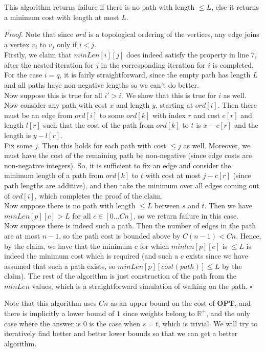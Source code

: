 \documentclass[a4paper]{article}
\newenvironment{proof}{\begin{breakbox}\textit{Proof.}}{\hfill$\square$\end{breakbox}}
\newcommand{\nl}{\vspace{0.2cm}\\}
\newcommand{\R}{\mathbb{R}}
\newcommand{\OPT}{\mathbf{OPT}}
\begin{document}
\begin{claim}
    This algorithm returns failure if there is no path with length $\le L$, else it returns a minimum cost with length at most $L$.
\end{claim}
\begin{proof}
    Note that since $ord$ is a topological ordering of the vertices, any edge joins a vertex $v_i$ to $v_j$ only if $i < j$.\nl
    Firstly, we claim that $minLen[i][j]$ does indeed satisfy the property in line $7$, after the nested iteration for $j$ in the corresponding iteration for $i$ is completed.\nl
    For the case $i = q$, it is fairly straightforward, since the empty path has length $L$ and all paths have non-negative lengths so we can't do better.\nl
    Now suppose this is true for all $i' > i$. We show that this is true for $i$ as well. Now consider any path with cost $x$ and length $y$, starting at $ord[i]$. Then there must be an edge from
    $ord[i]$ to some $ord[k]$ with index $r$ and cost $c[r]$ and length $l[r]$ such that the cost of the path from $ord[k]$ to $t$ is $x - c[r]$ and the length is $y - l[r]$.\nl
    Fix some $j$. Then this holds for each path with cost $\le j$ as well. Moreover, we must have the cost of the remaining path be non-negative (since edge costs are non-negative integers).
    So, it is sufficient to fix an edge and consider the minimum length of a path from $ord[k]$ to $t$ with cost at most $j - c[r]$ (since path lengths are additive), and then take the minimum
    over all edges coming out of $ord[i]$, which completes the proof of the claim.\nl
    Now suppose there is no path with length $\le L$ between $s$ and $t$. Then we have $minLen[p][c] > L$ for all $c \in [0\ldots Cn]$, so we return failure in this case.\nl
    Now suppose there is indeed such a path. Then the number of edges in the path are at most $n - 1$, so the path cost is bounded above by $C(n - 1) < Cn$. Hence, by the claim, we have that
    the minimum $c$ for which $minlen[p][c]$ is $\le L$ is indeed the minimum cost which is required (and such a $c$ exists since we have assumed that such a path exists, so
    $minLen[p][cost(path)] \le L$ by the claim). The rest of the algorithm is just construction of the path from the $minLen$ values, which is a straightforward simulation of walking on
    the path.
\end{proof}

Note that this algorithm uses $Cn$ as an upper bound on the cost of $\OPT$, and there is implicitly a lower bound of $1$ since weights belong to $\R^+$, and the only case where the answer is $0$
is the case when $s = t$, which is trivial. We will try to iteratively find better and better lower bounds so that we can get a better algorithm.\nl
\end{document}
